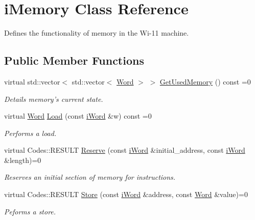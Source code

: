 \hypertarget{classiMemory}{
\section{iMemory Class Reference}
\label{classiMemory}
}


Defines the functionality of memory in the Wi-\/11 machine.  


\subsection*{Public Member Functions}
\begin{DoxyCompactItemize}
\item 
virtual std::vector$<$ std::vector$<$ \hyperlink{classWord}{Word} $>$ $>$ \hyperlink{classiMemory_a1aba88f98a91fa2858b03422979e57d5}{GetUsedMemory} () const =0
\begin{DoxyCompactList}\small\item\em Details memory's current state. \item\end{DoxyCompactList}\item 
virtual \hyperlink{classWord}{Word} \hyperlink{classiMemory_a3352ba391fc9b69a0b8691b2d585596a}{Load} (const \hyperlink{classiWord}{iWord} \&w) const =0
\begin{DoxyCompactList}\small\item\em Performs a load. \item\end{DoxyCompactList}\item 
virtual Codes::RESULT \hyperlink{classiMemory_a27750e74d09fb473c163a4cc4c3e697b}{Reserve} (const \hyperlink{classiWord}{iWord} \&initial\_\-address, const \hyperlink{classiWord}{iWord} \&length)=0
\begin{DoxyCompactList}\small\item\em Reserves an initial section of memory for instructions. \item\end{DoxyCompactList}\item 
virtual Codes::RESULT \hyperlink{classiMemory_a2632c9999797b0799a7d6b0a59bfa91a}{Store} (const \hyperlink{classiWord}{iWord} \&address, const \hyperlink{classWord}{Word} \&value)=0
\begin{DoxyCompactList}\small\item\em Peforms a store. \item\end{DoxyCompactList}\end{DoxyCompactItemize}


